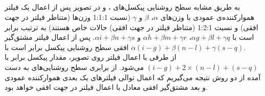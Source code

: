 \documentclass{article}
\begin{document}
\subsection{}
به طریق مشابه سطح روشنایی پیکسل‌های ،  و  در تصویر پس از اعمال یک فیلتر هموارکننده‌ی عمودی با وزن‌های $\alpha$، $\beta$ و $\gamma$ (نسبت 1:1:1 وزن‌ها (متناظر فیلتر  در جهت افقی) و نسبت 1:2:1 (متناظر فیلتر  در جهت افقی) حالات خاص هستند) به ترتیب برابر است با
$
\alpha g + \beta l + \gamma q
$،
$
\alpha h + \beta m + \gamma r
$
و
$
\alpha i + \beta n + \gamma s
$.
پس از اعمال فیلتر مشتق‌گیر افقی سطح روشنایی پیکسل  برابر است با 
$
\alpha (i - g) + \beta (n - l) + \gamma (s - q)
$. \\
از طرفی با اعمال فیلتر  روی تصویر، مقدار پیکسل  برابر با 
$
(i - g) + 2 \times (n - l) + (s - q)
$
می‌شود. از برابری سطح روشنایی‌های به دست آمده از دو روش نتیجه می‌گیریم که اعمال توالی فیلترهای یک بعدی هموارکننده عمودی و بعد مشتق‌گیر افقی معادل با اعمال فیلتر  در جهت افقی خواهد بود.
\end{document}
